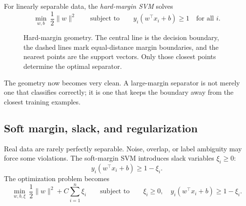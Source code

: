 \begin{definition}
For linearly separable data, the \emph{hard-margin SVM} solves
\[
\min_{w,b}\ \frac12\|w\|^2
\qquad
\text{subject to}
\qquad
y_i(w^\top x_i+b)\ge 1
\quad\text{for all }i.
\]
\end{definition}

\begin{figure}[tbp]
\centering
{}
\caption{Hard-margin geometry. The central line is the decision boundary, the dashed lines mark equal-distance margin boundaries, and the nearest points are the support vectors. Only those closest points determine the optimal separator.}
\end{figure}

The geometry now becomes very clean. A large-margin separator is not merely one that classifies correctly; it is one that keeps the boundary away from the closest training examples.

\subsection*{Soft margin, slack, and regularization}

Real data are rarely perfectly separable. Noise, overlap, or label ambiguity may force some violations. The soft-margin SVM introduces slack variables $\xi_i\ge 0$:
\[
y_i(w^\top x_i+b)\ge 1-\xi_i.
\]
The optimization problem becomes
\[
\min_{w,b,\xi}\ \frac12\|w\|^2 + C\sum_{i=1}^n \xi_i
\qquad
\text{subject to}
\qquad
\xi_i\ge 0,
\quad
y_i(w^\top x_i+b)\ge 1-\xi_i.
\]

